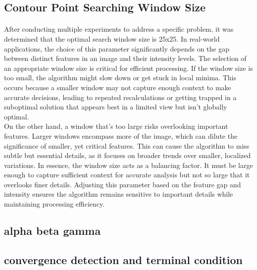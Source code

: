 \documentclass[12pt,a4paper]{report}
\begin{document}
\subsection{Contour Point Searching Window Size}
\paragraph*{}
After conducting multiple experiments to address a specific problem, it was determined that the optimal search window size is 25x25. In real-world applications, the choice of this parameter significantly depends on the gap between distinct features in an image and their intensity levels. The selection of an appropriate window size is critical for efficient processing. If the window size is too small, the algorithm might slow down or get stuck in local minima. This occurs because a smaller window may not capture enough context to make accurate decisions, leading to repeated recalculations or getting trapped in a suboptimal solution that appears best in a limited view but isn't globally optimal.\\
On the other hand, a window that's too large risks overlooking important features. Larger windows encompass more of the image, which can dilute the significance of smaller, yet critical features. This can cause the algorithm to miss subtle but essential details, as it focuses on broader trends over smaller, localized variations. In essence, the window size acts as a balancing factor. It must be large enough to capture sufficient context for accurate analysis but not so large that it overlooks finer details. Adjusting this parameter based on the feature gap and intensity ensures the algorithm remains sensitive to important details while maintaining processing efficiency.

\subsection{alpha beta gamma}
\paragraph*{}

\subsection{convergence detection and terminal condition}
\paragraph*{}
\end{document}
